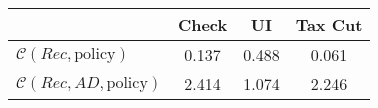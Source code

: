 \begin{tabular}{@{}lccc@{}} 
\toprule 
                          & Check      & UI    & Tax Cut    \\  \midrule 
$\mathcal{C}(Rec,\text{policy})$ & 0.137  & 0.488  & 0.061     \\ 
$\mathcal{C}(Rec, AD,\text{policy})$ & 2.414  & 1.074  & 2.246     \\ 
\end{tabular}  
